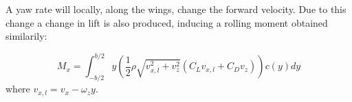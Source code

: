 A yaw rate will locally, along the wings, change the forward velocity.
Due to this change a change in lift is also produced, inducing a rolling moment obtained similarily:

\begin{equation}
	M_x = \int_{-b/2}^{b/2} y \left( \frac{1}{2} \rho \sqrt{v_{x,l}^2 + v_z^2} \left( C_L v_{x,l} + C_D v_{z} \right) \right) c(y) dy
\end{equation}
where $v_{x,l} = v_x - \omega_z y$.

